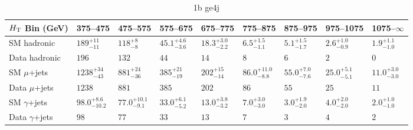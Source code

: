 \documentclass[8pt]{article}
\def\scalht{\mbox{$H_{\rm{T}}$}\xspace}
\newcommand\T{\rule{0pt}{2.6ex}}
\newcommand\B{\rule[-1.2ex]{0pt}{0pt}}
\begin{document}
\begin{table}[ht!]
\caption{1b ge4j}
\label{tab:ensemble-1b ge4j}
\centering
\begin{tabular}{ lllllllll }

\hline
\scalht Bin (GeV)       & 375--475                       & 475--575                       & 575--675                       & 675--775                       & 775--875                       & 875--975                       & 975--1075                      & 1075--$\infty$                 \\ [1.000000ex]
\hline
SM hadronic\T           & $189^{+11}_{-11}$              & $118^{+8}_{-8}$                & $45.1^{+4.6}_{-3.6}$           & $18.3^{+3.0}_{-2.2}$           & $6.5^{+1.5}_{-1.1}$            & $5.1^{+1.5}_{-1.7}$            & $2.6^{+1.0}_{-0.9}$            & $1.9^{+1.1}_{-1.0}$            \\ 
Data hadronic\B         & $196$                          & $132$                          & $44$                           & $14$                           & $8$                            & $6$                            & $2$                            & $0$                            \\ 
\hline
SM $\mu$+jets\T         & $1238^{+34}_{-43}$             & $881^{+24}_{-36}$              & $385^{+21}_{-19}$              & $202^{+15}_{-14}$              & $86.0^{+11.0}_{-8.8}$          & $55.0^{+7.0}_{-7.6}$           & $25.0^{+5.1}_{-5.1}$           & $11.0^{+3.0}_{-3.0}$           \\ 
Data $\mu$+jets\B       & $1238$                         & $881$                          & $385$                          & $202$                          & $86$                           & $55$                           & $25$                           & $11$                           \\ 
\hline
SM $\gamma$+jets\T      & $98.0^{+8.6}_{-10.2}$          & $77.0^{+10.1}_{-9.1}$          & $33.0^{+6.1}_{-5.2}$           & $13.0^{+3.8}_{-3.2}$           & $7.0^{+3.0}_{-3.0}$            & $3.0^{+1.9}_{-2.0}$            & $4.0^{+2.0}_{-2.0}$            & $2.0^{+1.0}_{-1.0}$            \\ 
Data $\gamma$+jets\B    & $98$                           & $77$                           & $33$                           & $13$                           & $7$                            & $3$                            & $4$                            & $2$                            \\ 
\hline

\end{tabular}
\end{table}
\end{document}
